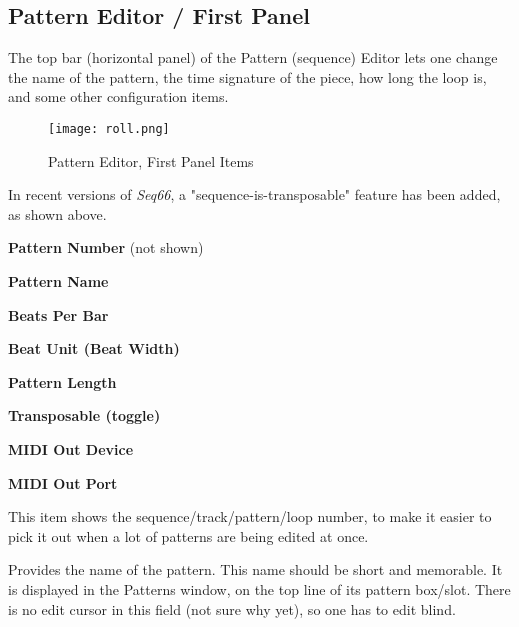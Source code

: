 \subsection{Pattern Editor / First Panel}
\label{subsec:pattern_editor_first}

   The top bar (horizontal panel) of the Pattern (sequence) Editor
   lets one change the name of
   the pattern, the time signature of the piece, how long the loop is, and
   some other configuration items.

\begin{figure}[H]
   \centering 
   \texttt{[image: roll.png]}
   \caption{Pattern Editor, First Panel Items}
   \label{fig:pattern_editor_first_panel_items}
\end{figure}

   In recent versions of \textsl{Seq66}, a "sequence-is-transposable"
   feature has been added, as shown above.


   \begin{enumber}
      \item \textbf{Pattern Number} (not shown)
      \item \textbf{Pattern Name}
      \item \textbf{Beats Per Bar}
      \item \textbf{Beat Unit (Beat Width)}
      \item \textbf{Pattern Length}
      \item \textbf{Transposable (toggle)}
      \item \textbf{MIDI Out Device}
      \item \textbf{MIDI Out Port}
   \end{enumber}

   \setcounter{ItemCounter}{0}      %

   This item shows the sequence/track/pattern/loop
   number, to make it easier to pick it out when a lot of patterns are being
   edited at once.

   Provides the name of the pattern.
   This name should be short and memorable.
   It is displayed in the Patterns window, on the top line of its pattern
   box/slot.
   There is no edit cursor in this field (not sure why yet), so
   one has to edit blind.

